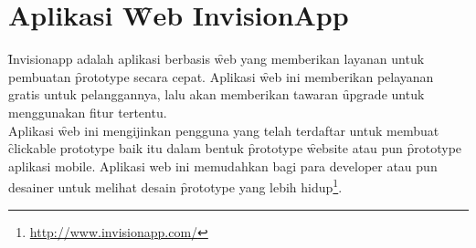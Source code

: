 \section{Aplikasi \f{Web} InvisionApp}\label{subsec:invisionapp}
\f{Invisionapp} adalah aplikasi berbasis \f{web} yang memberikan layanan untuk pembuatan \f{prototype} secara cepat. Aplikasi \f{web} ini memberikan pelayanan gratis untuk pelanggannya, lalu akan memberikan tawaran \f{upgrade} untuk menggunakan fitur tertentu.
\newline\\
Aplikasi \f{web} ini mengijinkan pengguna yang telah terdaftar untuk membuat \f{clickable prototype} baik itu dalam bentuk \f{prototype} \f{website} atau pun \f{prototype} aplikasi mobile. Aplikasi web ini memudahkan bagi para developer atau pun desainer untuk melihat desain \f{prototype} yang lebih hidup\footnote{\url{http://www.invisionapp.com/}}.
